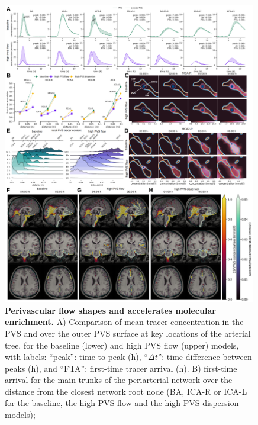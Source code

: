 \documentclass[fleqn,10pt]{wlscirep}
\begin{document}
\begin{figure}
    \centering
    \includegraphics[width=0.99\textwidth]{figures/figure3b.png}
    \caption{\textbf{Perivascular flow shapes and accelerates molecular enrichment.}
    A) Comparison of mean tracer concentration in the PVS and over the outer PVS surface at key locations of the arterial tree, for the baseline (lower) and high PVS flow (upper) models, with labels: ``peak'': time-to-peak (h), ``$\Delta t$'': time difference between peaks (h), and ``FTA'': first-time tracer arrival (h).
    B) first-time arrival for the main trunks of the periarterial network over the distance from the closest network root node (BA, ICA-R or ICA-L for the baseline, the high PVS flow and the high PVS dispersion models);}
    \label{fig:pvs_b}
\end{figure}
\end{document}
